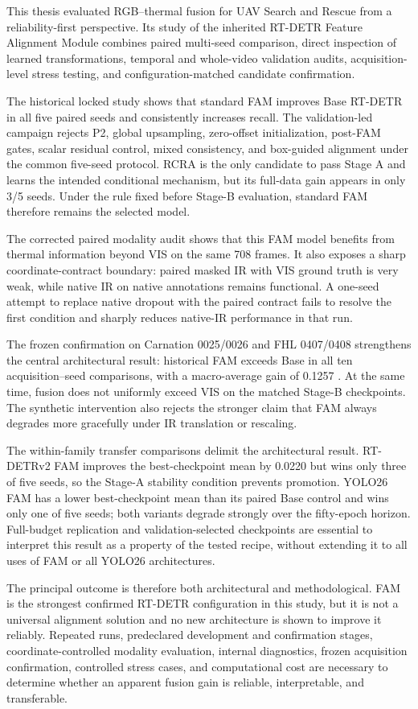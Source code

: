 This thesis evaluated RGB--thermal fusion for UAV Search and Rescue from a
reliability-first perspective. Its study of the inherited RT-DETR Feature
Alignment Module combines paired multi-seed comparison, direct inspection of
learned transformations, temporal and whole-video validation audits,
acquisition-level stress testing, and configuration-matched candidate
confirmation.

The historical locked study shows that standard FAM improves Base RT-DETR in
all five paired seeds and consistently increases recall. The
validation-led campaign rejects P2, global upsampling, zero-offset
initialization, post-FAM gates, scalar residual control, mixed consistency,
and box-guided alignment under the common five-seed protocol. RCRA is the
only candidate to pass Stage A and learns the intended conditional mechanism, but
its full-data gain appears in only 3/5 seeds. Under the rule fixed before
Stage-B evaluation, standard FAM therefore remains the selected model.

The corrected paired modality audit shows that this FAM model benefits from
thermal information beyond VIS on the same 708 frames. It also exposes a sharp
coordinate-contract boundary: paired masked IR with VIS ground truth is very
weak, while native IR on native annotations remains functional. A one-seed
attempt to replace native dropout with the paired contract fails to resolve the
first condition and sharply reduces native-IR performance in that run.

The frozen confirmation on Carnation 0025/0026 and FHL 0407/0408 strengthens
the central architectural result: historical FAM exceeds Base in all ten
acquisition--seed comparisons, with a macro-average gain of 0.1257 \mapfifty{}.
At the same time, fusion does not uniformly exceed VIS on the matched Stage-B
checkpoints. The synthetic intervention also rejects the stronger claim that
FAM always degrades more gracefully under IR translation or rescaling.

The within-family transfer comparisons delimit the architectural result.
RT-DETRv2 FAM improves the best-checkpoint mean by 0.0220 but wins only three
of five seeds, so the Stage-A stability condition prevents promotion.
YOLO26 FAM has a lower best-checkpoint mean than its paired Base control
and wins only one of five seeds; both variants degrade strongly over the
fifty-epoch horizon. Full-budget replication and validation-selected checkpoints
are essential to interpret this result as a property of the tested recipe,
without extending it to all uses of FAM or all YOLO26 architectures.

The principal outcome is therefore both architectural and methodological. FAM
is the strongest confirmed RT-DETR configuration in this study, but it is
not a universal alignment solution and no new architecture is shown to improve
it reliably. Repeated runs, predeclared development and confirmation stages,
coordinate-controlled modality evaluation, internal diagnostics, frozen
acquisition confirmation, controlled stress cases, and computational cost are
necessary to determine whether an
apparent fusion gain is reliable, interpretable, and transferable.
